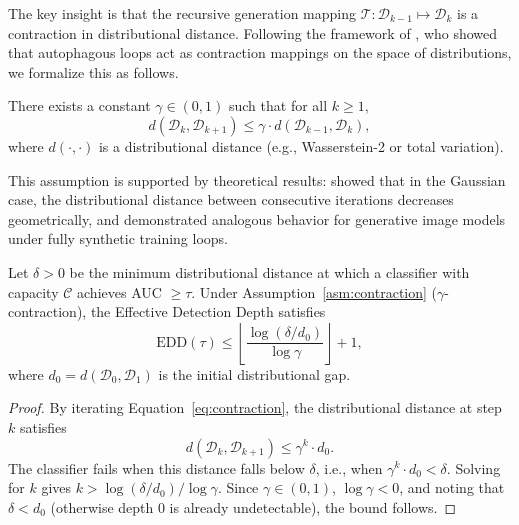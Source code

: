 The key insight is that the recursive generation mapping $\mathcal{T}: \mathcal{D}_{k-1} \mapsto \mathcal{D}_k$ is a contraction in distributional distance. Following the framework of \citet{alemohammad2024selfconsuming}, who showed that autophagous loops act as contraction mappings on the space of distributions, we formalize this as follows.

\begin{assumption}
\label{asm:contraction}
There exists a constant $\gamma \in (0, 1)$ such that for all $k \geq 1$,
\begin{equation}
    d(\mathcal{D}_k, \mathcal{D}_{k+1}) \leq \gamma \cdot d(\mathcal{D}_{k-1}, \mathcal{D}_k),
    \label{eq:contraction}
\end{equation}
where $d(\cdot, \cdot)$ is a distributional distance (e.g., Wasserstein-2 or total variation).
\end{assumption}

This assumption is supported by theoretical results: \citet{shumailov2024collapse} showed that in the Gaussian case, the distributional distance between consecutive iterations decreases geometrically, and \citet{alemohammad2024selfconsuming} demonstrated analogous behavior for generative image models under fully synthetic training loops.

\begin{proposition}
\label{thm:edd}
Let $\delta > 0$ be the minimum distributional distance at which a classifier with capacity $\mathcal{C}$ achieves AUC $\geq \tau$. Under Assumption~\ref{asm:contraction} ($\gamma$-contraction), the Effective Detection Depth satisfies
\begin{equation}
    \text{EDD}(\tau) \leq \left\lfloor \frac{\log(\delta / d_0)}{\log \gamma} \right\rfloor + 1,
    \label{eq:edd_bound}
\end{equation}
where $d_0 = d(\mathcal{D}_0, \mathcal{D}_1)$ is the initial distributional gap.
\end{proposition}

\begin{proof}
By iterating Equation~\eqref{eq:contraction}, the distributional distance at step $k$ satisfies
\begin{equation}
    d(\mathcal{D}_k, \mathcal{D}_{k+1}) \leq \gamma^k \cdot d_0.
\end{equation}
The classifier fails when this distance falls below $\delta$, i.e., when $\gamma^k \cdot d_0 < \delta$. Solving for $k$ gives $k > \log(\delta / d_0) / \log \gamma$. Since $\gamma \in (0,1)$, $\log \gamma < 0$, and noting that $\delta < d_0$ (otherwise depth 0 is already undetectable), the bound follows.
\end{proof}

